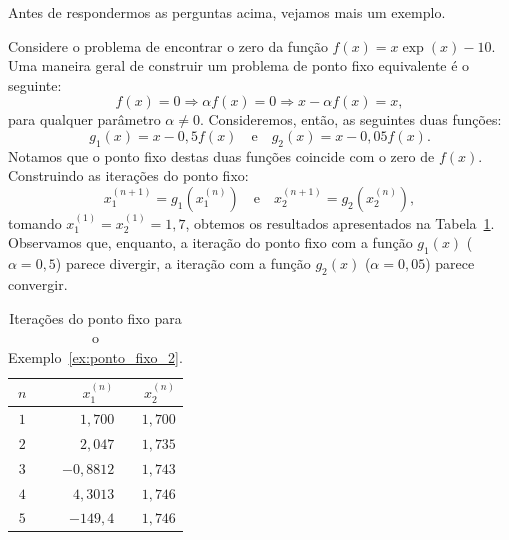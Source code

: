 
Antes de respondermos as perguntas acima, vejamos mais um exemplo.

\begin{ex}\label{ex:ponto_fixo_2}
  Considere o problema de encontrar o zero da função $f(x) = x\exp(x) - 10$. Uma maneira geral de construir um problema de ponto fixo equivalente é o seguinte:
  \begin{equation*}
    f(x) = 0 \Rightarrow \alpha f(x) = 0 \Rightarrow x - \alpha f(x) = x,
  \end{equation*}
para qualquer parâmetro $\alpha\neq 0$. Consideremos, então, as seguintes duas funções:
\begin{equation*}
  g_1(x) = x - 0,5f(x)\quad\text{e}\quad g_2(x) = x - 0,05f(x).
\end{equation*}
Notamos que o ponto fixo destas duas funções coincide com o zero de $f(x)$. Construindo as iterações do ponto fixo:
\begin{equation*}
  x_1^{(n+1)} = g_1(x_1^{(n)})\quad\text{e}\quad x_2^{(n+1)} = g_2(x_2^{(n)}),
\end{equation*}
tomando $x_1^{(1)} = x_2^{(1)} = 1,7$, obtemos os resultados apresentados na Tabela~\ref{tab:ponto_fixo_2}. Observamos que, enquanto, a iteração do ponto fixo com a função $g_1(x)$ ($\alpha = 0,5$) parece divergir, a iteração com a função $g_2(x)$ ($\alpha = 0,05$) parece convergir.
\begin{table}
  \centering
  \caption{Iterações do ponto fixo para o Exemplo~\ref{ex:ponto_fixo_2}.}\label{tab:ponto_fixo_2}
  \begin{tabular}{c|rr}\hline
    $n$ & $x_1^{(n)}$ & $x_2^{(n)}$ \\\hline
    $1$ & $1,700$ & $1,700$\\
    $2$ & $2,047$ & $1,735$\\
    $3$ & $-0,8812$ & $1,743$ \\
    $4$ & $4,3013$ & $1,746$\\
    $5$ & $-149,4$ & $1,746$\\\hline
  \end{tabular}
\end{table}
\end{ex}



